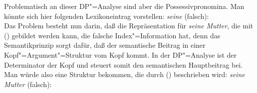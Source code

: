 Problematisch an dieser DP"=Analyse sind aber die Possessivpronomina. Man könnte sich
hier folgenden Lexikoneintrag vorstellen:
\eas
\textit{seine} (falsch):\\
\zs
Das Problem besteht nun darin, daß die Repräsentation für \emph{seine Mutter},
die mit () gebildet werden kann, die falsche Index"=Information hat, denn das Semantikprinzip
sorgt dafür, daß der semantische Beitrag in einer Kopf"=Argument"=Struktur vom Kopf kommt. In der
DP"=Analyse ist der Determinator der Kopf und steuert somit den semantischen Hauptbeitrag bei. Man
würde also eine Struktur bekommen, die durch () beschrieben wird:
\eas
\textit{seine Mutter} (falsch):\\
